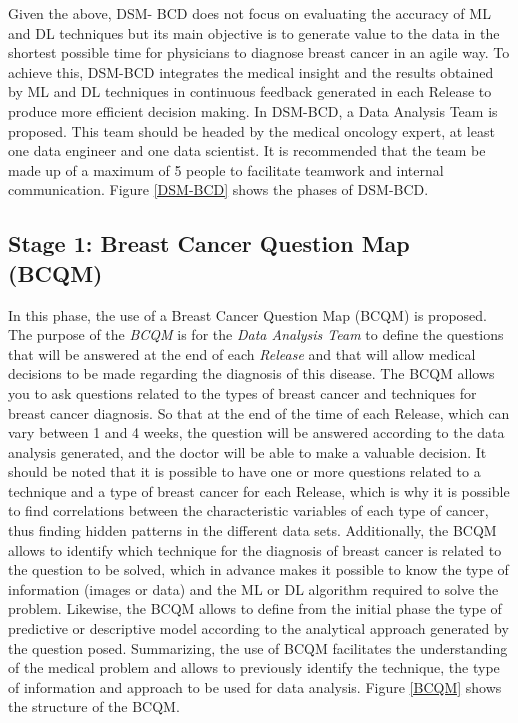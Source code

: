 Given the above, DSM- BCD does not focus on evaluating the accuracy of ML and DL techniques but its main objective is to generate value to the data in the shortest possible time for physicians to diagnose breast cancer in an agile way. To achieve this, DSM-BCD integrates the medical insight and the results obtained by ML and DL techniques in continuous feedback generated in each Release to produce more efficient decision making. In DSM-BCD, a Data Analysis Team is proposed. This team should be headed by the medical oncology expert, at least one data engineer and one data scientist. It is recommended that the team be made up of a maximum of 5 people to facilitate teamwork and internal communication. Figure \ref{DSM-BCD} shows the phases of DSM-BCD. 

\subsection*{Stage 1: Breast Cancer Question Map (BCQM)} 
In this phase, the use of a Breast Cancer Question Map (BCQM) is proposed. The purpose of the \textit{BCQM} is for the \textit{Data Analysis Team} to define the questions that will be answered at the end of each \textit{Release} and that will allow medical decisions to be made regarding the diagnosis of this disease. The BCQM allows you to ask questions related to the types of breast cancer and techniques for breast cancer diagnosis. So that at the end of the time of each Release, which can vary between 1 and 4 weeks, the question will be answered according to the data analysis generated, and the doctor will be able to make a valuable decision. It should be noted that it is possible to have one or more questions related to a technique and a type of breast cancer for each Release, which is why it is possible to find correlations between the characteristic variables of each type of cancer, thus finding hidden patterns in the different data sets. Additionally, the BCQM allows to identify which technique for the diagnosis of breast cancer is related to the question to be solved, which in advance makes it possible to know the type of information (images or data) and the ML or DL algorithm required to solve the problem. Likewise, the BCQM allows to define from the initial phase the type of predictive or descriptive model according to the analytical approach generated by the question posed. Summarizing, the use of BCQM facilitates the understanding of the medical problem and allows to previously identify the technique, the type of information and approach to be used for data analysis. Figure \ref{BCQM} shows the structure of the BCQM.


